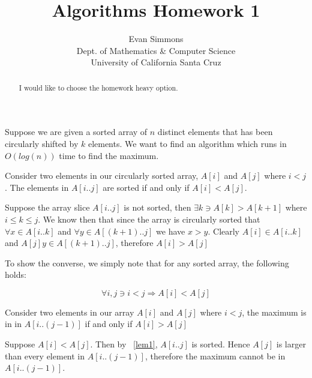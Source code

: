 \documentclass{amsart}
\theoremstyle{definition}
\theoremstyle{remark}
\numberwithin{equation}{section}
\begin{document}
\title[]{Algorithms Homework 1}%
\author{Evan Simmons \\
        Dept. of Mathematics \& Computer Science \\ University of California Santa Cruz}%
\renewcommand{\abstractname}{Homework Option}
\begin{abstract}
I would like to choose the homework heavy option.
\end{abstract}
\maketitle

\section{} Suppose we are given a sorted array of $n$ distinct elements
that has been circularly shifted by $k$ elements. We want to find an
algorithm which runs in $O(log(n))$ time to find the maximum.

\lem \label{lem1}

Consider two elements in our circularly sorted array, $A[i]$ and $A[j]$
where $i < j$. The elements in $A[i..j]$ are sorted if
and only if $A[i] < A[j]$.

\proof{} 

Suppose the array slice $A[i..j]$ is not sorted, then $\exists k \ni
A[k] > A[k+1]$ where $i \leq k \leq j$. We know then that since the
array is circularly sorted that $\forall x \in A[i..k]$ and $\forall y
\in A[(k+1)..j]$ we have $x > y$. Clearly $A[i] \in A[i..k]$ and $A[j] y
\in A[(k+1)..j]$, therefore $A[i] > A[j]$

To show the converse, we simply note that for any sorted array, the
following holds:

$$ \forall i,j \ni i<j \Rightarrow A[i] < A[j] $$

\cor \label{cor1}

Consider two elements in our array $A[i]$ and $A[j]$ where $i<j$, the maximum
is in in $A[i..(j-1)]$ if and only if $A[i] > A[j]$

\proof 

Suppose $A[i] < A[j]$. Then by ~\ref{lem1}, $A[i..j]$ is sorted. Hence
$A[j]$ is larger than every element in $A[i..(j-1)]$, therefore the maximum
cannot be in $A[i..(j-1)]$.
\end{document}
